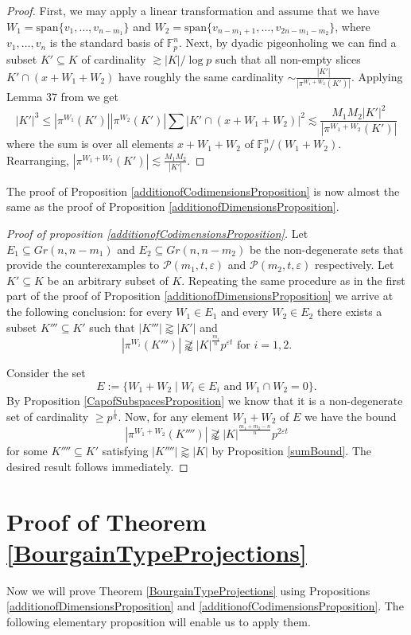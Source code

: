 \documentclass{amsart}
\newcommand{\F}{\mathbb F}
\begin{document}
\begin{proof}
First, we may apply a linear transformation and assume that we have $W_1 = \text{span}\{v_1, \ldots, v_{n - m_1}\}$ and $W_2 = \text{span}\{v_{n - m_1 + 1}, \ldots, v_{2n - m_1 - m_2}\}$, where $v_1, \ldots, v_n$ is the standard basis of $\F_p^n$. Next, by dyadic pigeonholing we can find a subset $K' \subseteq K$ of cardinality $\gtrsim |K|/\log p$ such that all non-empty slices $K' \cap (x + W_1 + W_2)$ have roughly the same cardinality $\sim \frac{|K'|}{|\pi^{W_1 + W_2}(K')|}$. Applying Lemma 37 from \cite{He18} we get 
$$|K'|^3 \leq |\pi^{W_1}(K')| |\pi^{W_2}(K')| \sum |K' \cap (x + W_1 + W_2)|^2 \lesssim \frac{M_1 M_2|K'|^2}{|\pi^{W_1 + W_2}(K')|}$$
where the sum is over all elements $x + W_1 + W_2$ of $\F_p^n/(W_1 + W_2)$.
Rearranging, $|\pi^{W_1 + W_2}(K')| \lesssim \frac{M_1 M_2}{|K'|} $.
\end{proof}

The proof of  Proposition \ref{additionofCodimensionsProposition} is now almost the same as the proof of Proposition \ref{additionofDimensionsProposition}.

\begin{proof}[Proof of proposition \ref{additionofCodimensionsProposition}]
    Let $E_1 \subseteq Gr(n, n - m_1)$ and $E_2 \subseteq Gr(n, n - m_2)$ be the non-degenerate sets that provide the counterexamples to $\mathcal{P}(m_1, t, \varepsilon)$ and $\mathcal{P}(m_2, t, \varepsilon)$ respectively. Let  $K' \subseteq K$ be an arbitrary subset of $K$. Repeating the same procedure as in the first part of the proof of Proposition \ref{additionofDimensionsProposition} we arrive at the following conclusion:
    for every $W_1 \in E_1$ and every $W_2 \in E_2$ there exists a subset $K''' \subseteq K'$ such that $|K'''| \gtrapprox|K'|$ and $$|\pi^{W_i}(K''')| \not \gtrapprox |K|^\frac{m_i}{n}p^{\varepsilon t} \text{ for } i = 1, 2.$$
    
    Consider the set $$E := \{W_1 + W_2 \mid W_i \in E_i \text{ and } W_1 \cap W_2 = 0\}.$$ By Proposition \ref{CapofSubspacesProposition} we know that it is a non-degenerate set of cardinality $\geq p^{\frac{t}{n}}$. Now, for any element $W_1 + W_2$ of $E$ we have the bound $$|\pi^{W_1 + W_2}(K'''')| \not \gtrapprox |K|^\frac{m_1 + m_2 - n}{n}p^{2 \varepsilon t}$$ for some $K'''' \subseteq K'$ satisfying $|K''''| \gtrapprox |K|$ by Proposition \ref{sumBound}. The desired result follows immediately.
\end{proof}

\section{Proof of Theorem \ref{BourgainTypeProjections}}
Now we will prove Theorem \ref{BourgainTypeProjections} using Propositions \ref{additionofDimensionsProposition} and \ref{additionofCodimensionsProposition}. The following elementary proposition will enable us to apply them.
\end{document}
